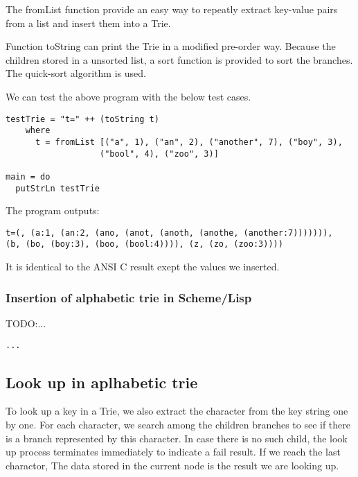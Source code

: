 \documentclass{article}
\begin{document}
The fromList function provide an easy way to repeatly extract
key-value pairs from a list and insert them into a Trie.

Function toString can print the Trie in a modified pre-order way.
Because the children stored in a unsorted list, a sort function is
provided to sort the branches. The quick-sort algorithm is used.

We can test the above program with the below test cases.

\begin{lstlisting}
testTrie = "t=" ++ (toString t)
    where 
      t = fromList [("a", 1), ("an", 2), ("another", 7), ("boy", 3), 
                   ("bool", 4), ("zoo", 3)]

main = do
  putStrLn testTrie
\end{lstlisting}

The program outputs:

\begin{verbatim}
t=(, (a:1, (an:2, (ano, (anot, (anoth, (anothe, (another:7))))))), 
(b, (bo, (boy:3), (boo, (bool:4)))), (z, (zo, (zoo:3))))
\end{verbatim}

It is identical to the ANSI C result exept the values we inserted.

\subsubsection*{Insertion of alphabetic trie in Scheme/Lisp}

TODO:...

\lstset{language=lisp}
\begin{lstlisting}
...
\end{lstlisting}

\subsection{Look up in aplhabetic trie}
To look up a key in a Trie, we also extract the character from the
key string one by one. For each character, we search among the children
branches to see if there is a branch represented by this character.
In case there is no such child, the look up process terminates 
immediately to indicate a fail result. If we reach the last charactor,
The data stored in the current node is the result we are looking up.
\end{document}
